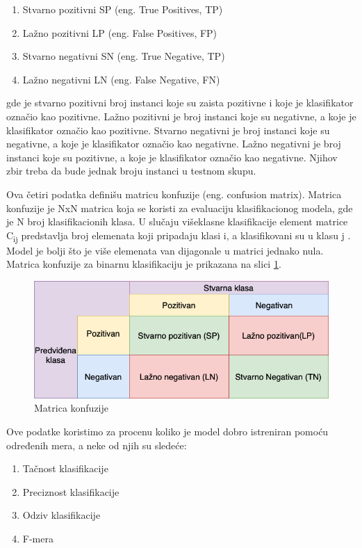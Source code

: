 \documentclass[12pt,oneside]{memoir}
\begin{document}
\begin{enumerate}
\item Stvarno pozitivni SP (eng. True Positives, TP)
\item Lažno pozitivni LP (eng. False Positives, FP)
\item Stvarno negativni SN (eng. True Negative, TP)
\item Lažno negativni LN (eng. False Negative, FN)
\end{enumerate}
\noindent
gde je stvarno pozitivni broj instanci koje su zaista pozitivne i koje je klasifikator označio kao pozitivne. Lažno pozitivni je broj instanci koje su negativne, a koje je klasifikator označio kao pozitivne. Stvarno negativni je broj instanci koje su negativne, a koje je klasifikator označio kao negativne. Lažno negativni je broj instanci koje su pozitivne, a koje je klasifikator označio kao negativne. Njihov zbir treba da bude jednak broju instanci u testnom skupu.

Ova četiri podatka definišu matricu konfuzije (eng. confusion matrix). Matrica konfuzije je NxN matrica koja se koristi za evaluaciju klasifikacionog modela, gde je N broj klasifikacionih klasa. U slučaju višeklasne klasifikacije element matrice C\textsubscript{ij} predstavlja broj elemenata koji pripadaju klasi i, a klasifikovani su u klasu j \cite{JelenaPHD}. Model je bolji što je više elemenata van dijagonale u matrici jednako nula. Matrica konfuzije za binarnu klasifikaciju je prikazana na slici \ref{img:confusionMatrix}.

\begin{figure}[h!]
\centering
\includegraphics[width=.7\textwidth]{images/confusionMatrix.png}
\caption{Matrica konfuzije}
\label{img:confusionMatrix}
\end{figure}
\newpage
Ove podatke koristimo za procenu koliko je model dobro istreniran pomoću određenih mera, a neke od njih su sledeće:

\begin{enumerate}
\item Tačnost klasifikacije
\item Preciznost klasifikacije
\item Odziv klasifikacije
\item F-mera
\end{enumerate}
\end{document}
